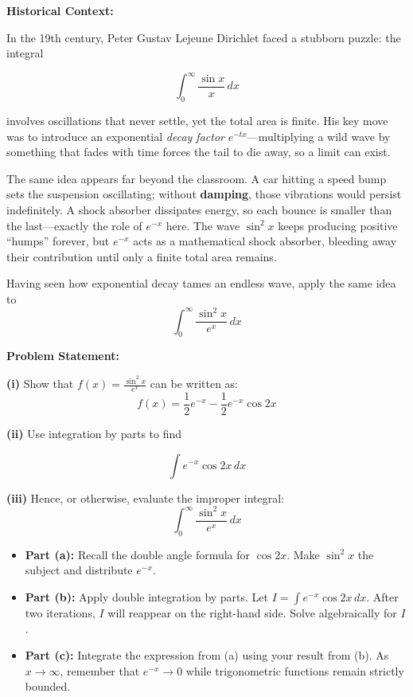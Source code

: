 \begin{problem}

\textbf{Historical Context:}

In the 19th century, Peter Gustav Lejeune Dirichlet faced a stubborn puzzle: the integral 

$$\int_0^\infty \frac{\sin x}{x}\, dx$$

involves oscillations that never settle, yet the total area is finite. 
His key move was to introduce an exponential \emph{decay factor} $e^{-tx}$---multiplying a wild wave by something that fades with time forces the tail to die away, so a limit can exist.

\vspace{0.3cm}

The same idea appears far beyond the classroom. A car hitting a speed bump sets the suspension oscillating; without \textbf{damping}, those vibrations would persist indefinitely. A shock absorber dissipates energy, so each bounce is smaller than the last---exactly the role of $e^{-x}$ here. The wave $\sin^2 x$ keeps producing positive ``humps'' forever, but $e^{-x}$ acts as a mathematical shock absorber, bleeding away their contribution until only a finite total area remains.

\vspace{0.3cm}

Having seen how exponential decay tames an endless wave, apply the same idea to 
$$\int_0^\infty \frac{\sin^2 x}{e^x} \, dx$$

\vspace{0.3cm}
\textbf{Problem Statement:}

\textbf{(i)} Show that $f(x) = \frac{\sin^2 x}{e^x}$ can be written as:
$$f(x) = \frac{1}{2} e^{-x} - \frac{1}{2} e^{-x} \cos 2x$$

\textbf{(ii)} Use integration by parts to find 

$$\int e^{-x} \cos 2x \, dx$$

\textbf{(iii)} Hence, or otherwise, evaluate the improper integral:
$$\int_0^\infty \frac{\sin^2 x}{e^x} \, dx$$

\end{problem}

\begin{hint}
\begin{itemize}
    \item \textbf{Part (a):} Recall the double angle formula for $\cos 2x$. Make $\sin^2 x$ the subject and distribute $e^{-x}$.
    \item \textbf{Part (b):} Apply double integration by parts. Let $I = \int e^{-x} \cos 2x \, dx$. After two iterations, $I$ will reappear on the right-hand side. Solve algebraically for $I$.
    \item \textbf{Part (c):} Integrate the expression from (a) using your result from (b). As $x \to \infty$, remember that $e^{-x} \to 0$ while trigonometric functions remain strictly bounded.
\end{itemize}
\end{hint}

